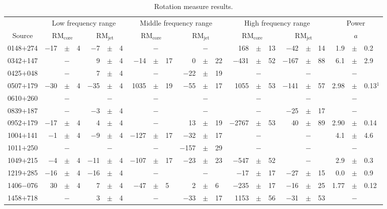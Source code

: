 \documentclass[a4paper,fleqn,usenatbib,useAMS]{mnras}
\begin{document}
\begin{table*}
 \centering
 \begin{minipage}{175mm}
  \caption{Rotation measure results.}
  \begin{tabular}{cr@{}c@{}lr@{}c@{}lr@{}c@{}lr@{}c@{}lr@{}c@{}lr@{}c@{}lr@{}c@{}l}
  \hline
  &\multicolumn{6}{c}{Low frequency range}&\multicolumn{6}{c}{Middle frequency range}&\multicolumn{6}{c}{High frequency range}&\multicolumn{3}{c}{Power}\\
 Source&\multicolumn{3}{c}{$\mathrm{RM}_\mathrm{core}$}&\multicolumn{3}{c}{$\mathrm{RM}_\mathrm{jet}$}&\multicolumn{3}{c}{$\mathrm{RM}_\mathrm{core}$}
 &\multicolumn{3}{c}{$\mathrm{RM}_\mathrm{jet}$}&\multicolumn{3}{c}{$\mathrm{RM}_\mathrm{core}$}&\multicolumn{3}{c}{$\mathrm{RM}_\mathrm{jet}$}&
 \multicolumn{3}{c}{$a$}\\
  \hline
0148$+$274&$-$17&$\pm$&4&$-$7&$\pm$&4&	&$-$&&	&$-$&&	168&$\pm$&13&$-$42&$\pm$&14&1.9&$\pm$&0.2\\
0342$+$147&&$-$&&	9&$\pm$&4&$-$14&$\pm$&17&	0&$\pm$&22&$-$431&$\pm$&52&$-$167&$\pm$&88&6.1&$\pm$&2.9\\
0425$+$048&&$-$&&	7&$\pm$&4&	&$-$&&$-$22&$\pm$&19&	&$-$&&	&$-$&&	&$-$&\\
0507$+$179&$-$30&$\pm$&4&$-$35&$\pm$&4&1035&$\pm$&19&$-$55&$\pm$&17&1055&$\pm$&53&$-$141&$\pm$&57&2.98&$\pm$&0.13$^1$\\
0610$+$260&&$-$&&	&$-$&&	&$-$&&	&$-$&&	&$-$&&	&$-$&&	&$-$&\\ 
0839$+$187&&$-$&&$-$3&$\pm$&4&	&$-$&&	&$-$&&	&$-$&&$-$25&$\pm$&17&	&$-$&\\
0952$+$179&$-$17&$\pm$&4&4&$\pm$&4&	&$-$&&	13&$\pm$&19&$-$2767&$\pm$&53&40&$\pm$&89&2.90&$\pm$&0.14\\
1004$+$141&$-$1&$\pm$&4&$-$9&$\pm$&4&$-$127&$\pm$&17&$-$32&$\pm$&17&&$-$&&&$-$&&4.1&$\pm$&4.6\\
1011$+$250&&$-$&&	&$-$&&	&$-$&&$-$157&$\pm$&29&	&$-$&&	&$-$&&	&$-$&\\
1049$+$215&$-$4&$\pm$&4&$-$11&$\pm$&4&$-$107&$\pm$&17&$-$23&$\pm$&23&$-$547&$\pm$&52&	&$-$&&2.9&$\pm$&0.3\\
1219$+$285&$-$16&$\pm$&4&$-$16&$\pm$&4&	&$-$&&	&$-$&&$-$17&$\pm$&17&$-$27&$\pm$&15&0.0&$\pm$&0.9\\
1406$-$076&30&$\pm$&4&7&$\pm$&4&$-$47&$\pm$&5&2&$\pm$&6&$-$235&$\pm$&17&$-$16&$\pm$&25&1.77&$\pm$&0.12\\
1458$+$718&&$-$&&3&$\pm$&4&	&$-$&&$-$33&$\pm$&17&1153&$\pm$&56&$-$31&$\pm$&53&&$-$&\\

\end{tabular}
\end{minipage}
\end{table*}
\end{document}
